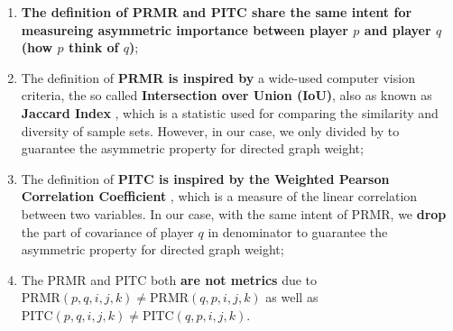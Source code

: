 \begin{enumerate}
\item \textbf{The definition of PRMR and PITC share the same intent for measureing asymmetric importance  
      between player $p$ and player $q$ (how $p$ think of $q$)};
\item The definition of \textbf{PRMR is inspired by} a wide-used computer vision criteria, the so called \textbf{Intersection over Union (IoU)}, 
      also as known as \textbf{Jaccard Index} \cite{real1996probabilistic, wiki:JaccardIndex},
      which is a statistic used for comparing the similarity and diversity of sample sets. 
      However, in our case, we only divided by to guarantee the asymmetric property for directed graph weight;
\item The definition of \textbf{PITC is inspired by the Weighted Pearson Correlation Coefficient} \cite{wiki:PearsonCorrelationCoefficient},
      which is a measure of the linear correlation between two variables. In our case, with the same intent of PRMR, 
      we \textbf{drop} the
      part of covariance of player $q$ in denominator to guarantee the asymmetric property for directed graph weight; 
\item The PRMR and PITC both \textbf{are not metrics} due to $\text{PRMR}(p, q, i, j, k) \neq \text{PRMR}(q, p, i, j, k)$ as well as
$\text{PITC}(p, q, i, j, k) \neq \text{PITC}(q, p, i, j, k)$.
\end{enumerate}

